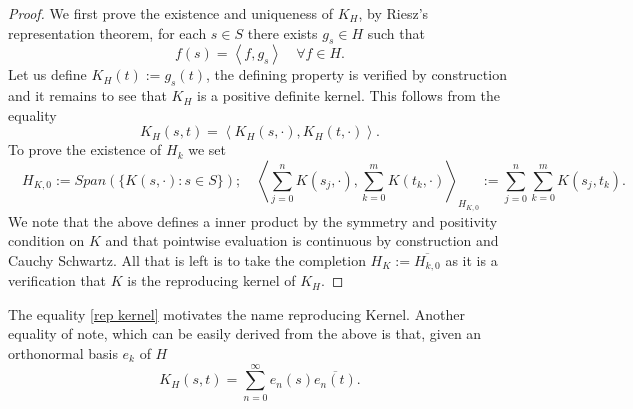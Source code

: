 \documentclass[12pt]{article}
\newcommand{\br}[1]{\left\langle#1\right\rangle}
\begin{document}
\begin{proof}
	We first prove the existence and uniqueness of $K_H$, by Riesz's representation theorem, for each $s\in S$ there exists $g_s\in H$ such that
	\begin{equation*}
		f(s)=\br{f,g_s}\quad\forall f\in H.
	\end{equation*}
	Let us define $K_H(t):=g_s(t)$, the defining property is verified by construction and it remains to see that $K_H$ is a positive definite
	kernel. This follows from the equality
	\begin{equation}\label{rep kernel}
		K_H(s,t)=\br{K_H(s,\cdot ),K_H(t,\cdot )}.
	\end{equation}
	To prove the existence of $H_k$ we set
	\begin{equation*}
		\quad H_{K,0}:=Span(\{K(s,\cdot ):s\in S\});\quad \br{\sum_{j=0}^{n}K(s_j,\cdot ),\sum_{k=0}^{m} K(t_k,\cdot )}_{H_{K,0}}:=\sum_{j=0}^{n}\sum_{k=0}^{m}K(s_j,t_k).
	\end{equation*}
	We note that the above defines a inner product by the symmetry and positivity condition on $K$ and that pointwise evaluation is continuous by construction and Cauchy Schwartz. All that is left is to take the completion  $H_K:=\overline{H_{k,0}}$ as it is a verification that $K$ is the reproducing kernel of  $K_H$.
\end{proof}
The equality \eqref{rep kernel} motivates the name reproducing Kernel. Another equality of note, which can be easily derived from the above is that, given an orthonormal basis $e_k$ of $H$
\begin{equation*}
	K_H(s,t)=\sum_{n=0}^{\infty} e_n(s)\overline{e_n(t)}.
\end{equation*}
\end{document}
